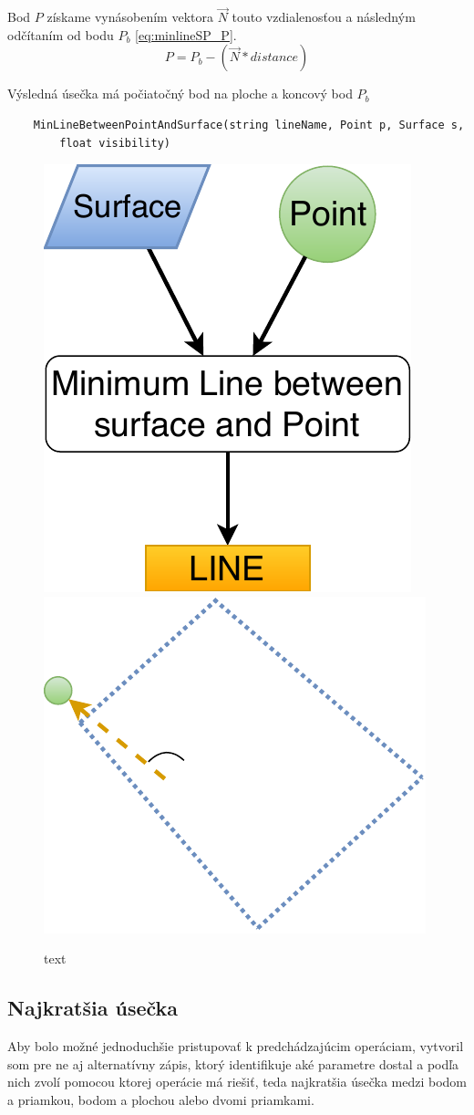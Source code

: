 Bod $P$ získame vynásobením vektora $\overrightarrow{N}$ touto vzdialenosťou a následným odčítaním od bodu $P_b$ \ref{eq:minlineSP_P}.
\begin{equation}
 P = P_b - (\overrightarrow{N} * distance)
    \label{eq:minlineSP_P}
\end{equation}

Výsledná úsečka má počiatočný bod na ploche a koncový bod $P_b$ 





\begin{lstlisting}
	MinLineBetweenPointAndSurface(string lineName, Point p, Surface s,
	    float visibility)
\end{lstlisting}

\begin{figure}[H]
	\centering
	\includegraphics[height=0.3\textwidth]{obrazky-figures/Diagram/Line/DP Navrh operacii-1D - LineMinSP.pdf}
	\includegraphics[height=0.3\textwidth]{obrazky-figures/Diagram/Draw/2Line/DP Navrh operacii-1D - LineMinSP.pdf}
	\caption{text}
	\label{fig:1}
\end{figure}


\subsection{Najkratšia úsečka}
Aby bolo možné jednoduchšie pristupovať k predchádzajúcim operáciam, vytvoril som pre ne aj alternatívny zápis, ktorý identifikuje aké parametre dostal a podľa nich zvolí pomocou ktorej operácie má riešiť, teda najkratšia úsečka medzi bodom a priamkou, bodom a plochou alebo dvomi priamkami.

